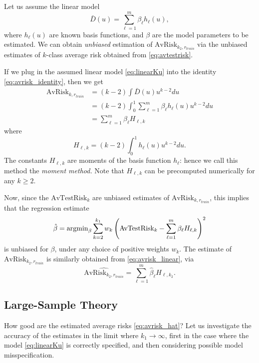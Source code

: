 Let us assume the linear model
\begin{equation}\label{eq:linearKu}
\bar{D}(u) = \sum_{\ell = 1}^m \beta_\ell h_\ell(u),
\end{equation}
where $h_\ell(u)$ are known basis functions, and $\beta$ are the model
parameters to be estimated. We can obtain \emph{unbiased} estimation
of $\text{AvRisk}_{k_2, r_{train}}$ via the unbiased estimates of
$k$-class average risk obtained from \eqref{eq:avtestrisk}.

If we plug in the assumed linear model \eqref{eq:linearKu} into the
identity \eqref{eq:avrisk_identity}, then we get
\begin{align}
\text{AvRisk}_{k, r_{train}} &= (k-2)\int \bar{D}(u) u^{k-2} du
\\&= (k-2)\int_0^1 \sum_{\ell = 1}^m \beta_\ell h_\ell(u) u^{k-2} du
\\&= \sum_{\ell = 1}^m \beta_\ell H_{\ell,k} \label{eq:avrisk_linear}
\end{align}
where
\begin{equation}
H_{\ell,k} = (k-2) \int_0^1 h_\ell(u) u^{k-2} du.
\end{equation}
The constants $H_{\ell, k}$ are moments of the basis function
$h_\ell$: hence we call this method the \emph{moment method.}  Note
that $H_{\ell, k}$ can be precomputed numerically for any $k \geq 2$.


Now, since the $\text{AvTestRisk}_k$ are unbiased estimates of
$\text{AvRisk}_{k, r_{train}}$, this implies that the regression
estimate
\[
\hat{\beta} = \text{argmin}_\beta \sum_{k=2}^{k_1} w_k \left(\text{AvTestRisk}_k - \sum_{\ell=1}^m \beta_\ell H_{\ell, k}\right)^2
\]
is unbiased for $\beta$, under any choice of positive weights $w_k$.
The estimate of $\text{AvRisk}_{k_2,r_{train}}$ is similarly obtained
from \eqref{eq:avrisk_linear}, via
\begin{equation}\label{eq:avrisk_hat}
\widehat{\text{AvRisk}_{k_2,r_{train}}} = \sum_{\ell=1}^m \hat{\beta}_\ell H_{\ell, k_2}.
\end{equation}

\subsection{Large-Sample Theory}

How good are the estimated average risks \eqref{eq:avrisk_hat}?  Let
us investigate the accuracy of the estimates in the limit where
$k_1 \to \infty$, first in the case where the
model \eqref{eq:linearKu} is correctly specified, and then considering
possible model misspecification.

